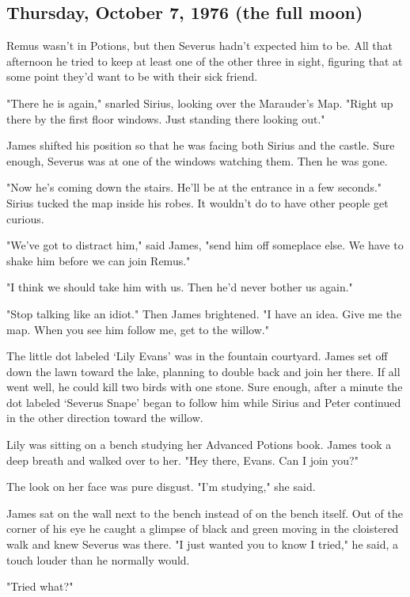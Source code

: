 \subsection{Thursday, October 7, 1976 (the full moon)}

Remus wasn't in Potions, but then Severus hadn't expected him to be. All that afternoon he tried to keep at least one of the other three in sight, figuring that at some point they'd want to be with their sick friend.

"There he is again," snarled Sirius, looking over the Marauder's Map. "Right up there by the first floor windows. Just standing there looking out."

James shifted his position so that he was facing both Sirius and the castle. Sure enough, Severus was at one of the windows watching them. Then he was gone.

"Now he's coming down the stairs. He'll be at the entrance in a few seconds." Sirius tucked the map inside his robes. It wouldn't do to have other people get curious.

"We've got to distract him," said James, "send him off someplace else. We have to shake him before we can join Remus."

"I think we should take him with us. Then he'd never bother us again."

"Stop talking like an idiot." Then James brightened. "I have an idea. Give me the map. When you see him follow me, get to the willow."

The little dot labeled `Lily Evans' was in the fountain courtyard. James set off down the lawn toward the lake, planning to double back and join her there. If all went well, he could kill two birds with one stone. Sure enough, after a minute the dot labeled `Severus Snape' began to follow him while Sirius and Peter continued in the other direction toward the willow.

Lily was sitting on a bench studying her Advanced Potions book. James took a deep breath and walked over to her. "Hey there, Evans. Can I join you?"

The look on her face was pure disgust. "I'm studying," she said.

James sat on the wall next to the bench instead of on the bench itself. Out of the corner of his eye he caught a glimpse of black and green moving in the cloistered walk and knew Severus was there. "I just wanted you to know I tried," he said, a touch louder than he normally would.

"Tried what?"

